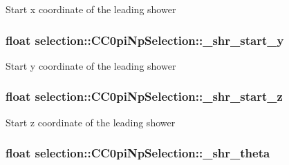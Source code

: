 Start x coordinate of the leading shower \hypertarget{classselection_1_1CC0piNpSelection_ade6717f479b053a2c2c9082e597d599f}{
\subsubsection[{\-\_\-shr\-\_\-start\-\_\-y}]{\setlength{\rightskip}{0pt plus 5cm}float selection\-::\-C\-C0pi\-Np\-Selection\-::\-\_\-shr\-\_\-start\-\_\-y\hspace{0.3cm}{\ttfamily [private]}}}\label{classselection_1_1CC0piNpSelection_ade6717f479b053a2c2c9082e597d599f}
Start y coordinate of the leading shower \hypertarget{classselection_1_1CC0piNpSelection_a6e8b4637c8de2991e4d48291d3e90ddf}{
\subsubsection[{\-\_\-shr\-\_\-start\-\_\-z}]{\setlength{\rightskip}{0pt plus 5cm}float selection\-::\-C\-C0pi\-Np\-Selection\-::\-\_\-shr\-\_\-start\-\_\-z\hspace{0.3cm}{\ttfamily [private]}}}\label{classselection_1_1CC0piNpSelection_a6e8b4637c8de2991e4d48291d3e90ddf}
Start z coordinate of the leading shower \hypertarget{classselection_1_1CC0piNpSelection_a624a38f7c8d33320df92e610fd0e16ee}{
\subsubsection[{\-\_\-shr\-\_\-theta}]{\setlength{\rightskip}{0pt plus 5cm}float selection\-::\-C\-C0pi\-Np\-Selection\-::\-\_\-shr\-\_\-theta\hspace{0.3cm}{\ttfamily [private]}}}\label{classselection_1_1CC0piNpSelection_a624a38f7c8d33320df92e610fd0e16ee}
